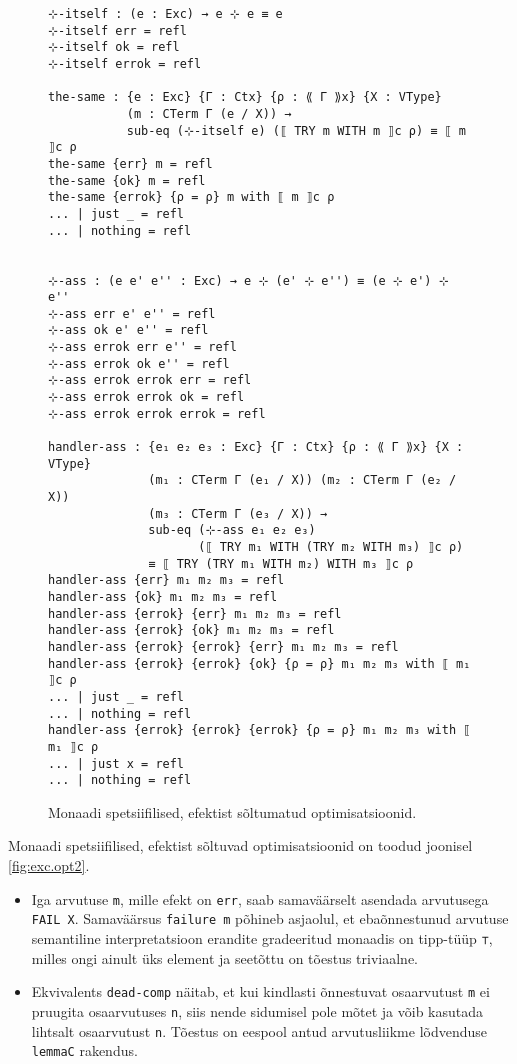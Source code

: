 \documentclass[a4paper,12pt]{article}
\begin{document}
\begin{figure}
  \begin{BVerbatim}
⊹-itself : (e : Exc) → e ⊹ e ≡ e
⊹-itself err = refl
⊹-itself ok = refl
⊹-itself errok = refl

the-same : {e : Exc} {Γ : Ctx} {ρ : ⟪ Γ ⟫x} {X : VType}
           (m : CTerm Γ (e / X)) →
           sub-eq (⊹-itself e) (⟦ TRY m WITH m ⟧c ρ) ≡ ⟦ m ⟧c ρ
the-same {err} m = refl
the-same {ok} m = refl
the-same {errok} {ρ = ρ} m with ⟦ m ⟧c ρ
... | just _ = refl
... | nothing = refl


⊹-ass : (e e' e'' : Exc) → e ⊹ (e' ⊹ e'') ≡ (e ⊹ e') ⊹ e''
⊹-ass err e' e'' = refl
⊹-ass ok e' e'' = refl
⊹-ass errok err e'' = refl
⊹-ass errok ok e'' = refl
⊹-ass errok errok err = refl
⊹-ass errok errok ok = refl
⊹-ass errok errok errok = refl

handler-ass : {e₁ e₂ e₃ : Exc} {Γ : Ctx} {ρ : ⟪ Γ ⟫x} {X : VType}
              (m₁ : CTerm Γ (e₁ / X)) (m₂ : CTerm Γ (e₂ / X))
              (m₃ : CTerm Γ (e₃ / X)) →
              sub-eq (⊹-ass e₁ e₂ e₃)
                     (⟦ TRY m₁ WITH (TRY m₂ WITH m₃) ⟧c ρ)
              ≡ ⟦ TRY (TRY m₁ WITH m₂) WITH m₃ ⟧c ρ
handler-ass {err} m₁ m₂ m₃ = refl
handler-ass {ok} m₁ m₂ m₃ = refl
handler-ass {errok} {err} m₁ m₂ m₃ = refl
handler-ass {errok} {ok} m₁ m₂ m₃ = refl
handler-ass {errok} {errok} {err} m₁ m₂ m₃ = refl
handler-ass {errok} {errok} {ok} {ρ = ρ} m₁ m₂ m₃ with ⟦ m₁ ⟧c ρ
... | just _ = refl
... | nothing = refl
handler-ass {errok} {errok} {errok} {ρ = ρ} m₁ m₂ m₃ with ⟦ m₁ ⟧c ρ
... | just x = refl
... | nothing = refl
  \end{BVerbatim}
  \caption{Monaadi spetsiifilised, efektist sõltumatud optimisatsioonid.}
  \label{fig:exc.opt1}
\end{figure}

Monaadi spetsiifilised, efektist sõltuvad optimisatsioonid on toodud joonisel \ref{fig:exc.opt2}.
\begin{itemize}
\item Iga arvutuse {\tt m}, mille efekt on {\tt err}, saab samaväärselt asendada arvutusega {\tt FAIL X}.
  Samaväärsus {\tt failure m} põhineb asjaolul, et ebaõnnestunud arvutuse semantiline interpretatsioon erandite gradeeritud monaadis on tipp-tüüp {\tt ⊤}, milles ongi ainult üks element ja seetõttu on tõestus triviaalne.
\item Ekvivalents {\tt dead-comp} näitab, et kui kindlasti õnnestuvat osaarvutust {\tt m} ei pruugita osaarvutuses {\tt n}, siis nende sidumisel pole mõtet ja võib kasutada lihtsalt osaarvutust {\tt n}. Tõestus on eespool antud arvutusliikme lõdvenduse {\tt lemmaC} rakendus.
\end{itemize}
\end{document}
